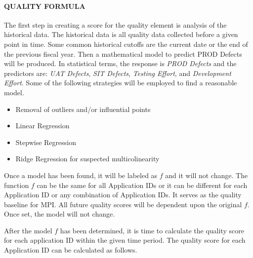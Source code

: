 \documentclass[SDSUThesis.tex]{subfiles}
\begin{document}
            \paragraph{QUALITY FORMULA}
                The first step in creating a score for the quality
                element is analysis of the historical data.  The historical
                data is all quality data collected before  a given point
                in time.  Some common historical cutoffs are the current date
                or the end of the previous fiscal year.  Then a mathematical
                model to predict PROD Defects will be produced.  In statistical
                terms, the response is \textit{PROD Defects} and the predictors
                are: \textit{UAT Defects}, \textit{SIT Defects}, 
                \textit{Testing Effort}, and \textit{Development Effort}.  
                Some of the following strategies will be employed to find 
                a reasonable model.
                \begin{itemize}
                    \item Removal of outliers and/or influential points
                    \item Linear Regression
                    \item Stepwise Regression
                    \item Ridge Regression for suspected multicolinearity
                \end{itemize}
                
                Once a model has been found, it will be labeled as $f$ and it
                will not change.  The function $f$ can be the same for all 
                Application IDs or it can be different for each Application ID
                or any combination of Application IDs.   It serves as the 
                quality baseline for MPI. 
                All future quality scores will be dependent upon the original
                $f$.  Once set, the model will not change.
                
                After the model $f$ has been determined, it is time
                to calculate the quality score for each application ID
                within the given time period.  The quality score
                for each Application ID can be calculated as follows.
                
\end{document}
